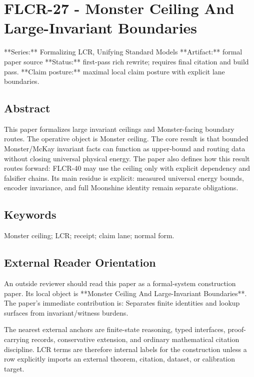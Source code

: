 \documentclass[11pt]{article}
\begin{document}
\section*{FLCR-27 - Monster Ceiling And Large-Invariant Boundaries}

**Series:** Formalizing LCR, Unifying Standard Models
**Artifact:** formal paper source
**Status:** first-pass rich rewrite; requires final citation and build pass.
**Claim posture:** maximal local claim posture with explicit lane boundaries.

\subsection*{Abstract}

This paper formalizes large invariant ceilings and Monster-facing boundary routes. The operative object is Monster ceiling. The core result is that bounded Monster/McKay invariant facts can function as upper-bound and routing data without closing universal physical energy. The paper also defines how this result routes forward: FLCR-40 may use the ceiling only with explicit dependency and falsifier chains. Its main residue is explicit: measured universal energy bounds, encoder invariance, and full Moonshine identity remain separate obligations.

\subsection*{Keywords}

Monster ceiling; LCR; receipt; claim lane; normal form.

\subsection*{External Reader Orientation}

An outside reviewer should read this paper as a formal-system construction paper. Its local object is **Monster Ceiling And Large-Invariant Boundaries**. The paper's immediate contribution is: Separates finite identities and lookup surfaces from invariant/witness burdens.

The nearest external anchors are finite-state reasoning, typed interfaces, proof-carrying records, conservative extension, and ordinary mathematical citation discipline. LCR terms are therefore internal labels for the construction unless a row explicitly imports an external theorem, citation, dataset, or calibration target.
\end{document}
